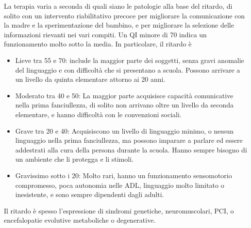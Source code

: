 La terapia varia a seconda di quali siano le patologie alla base del ritardo, di solito con un intervento riabilitativo precoce per
migliorare la comunicazione con la madre e la sperimentazione del bambino, e per migliorare la selezione delle informazioni rievanti nei
vari compiti.
Un QI minore di 70 indica un funzionamento molto sotto la media. In particolare, il ritardo è
\begin{itemize}
\item Lieve tra 55 e 70: include la maggior parte dei soggetti, senza gravi anomalie del linguaggio e con difficoltà che si presentano a
scuola. Possono arrivare a un livello da quinta elementare attorno ai 20 anni.
\item Moderato tra 40 e 50: La maggior parte acquisisce capacità comunicative nella prima fanciullezza, di solito non arrivano oltre un
livello da seconda elementare, e hanno difficoltà con le convenzioni sociali.
\item Grave tra 20 e 40: Acquisiscono un livello di linguaggio minimo, o nessun linguaggio nella prima fanciullezza, ma possono imparare
a parlare ed essere addestrati alla cura della persona durante la scuola. Hanno sempre bisogno di un ambiente che li protegga e li
stimoli.
\item Gravissimo sotto i 20: Molto rari, hanno un funzionamento sensomotorio compromesso, poca autonomia nelle ADL, linguaggio molto
limitato o inesistente, e sono sempre dipendenti dagli adulti.
\end{itemize}

Il ritardo è spesso l'espressione di sindromi genetiche, neuromuscolari, PCI, o encefalopatie evolutive metaboliche o degenerative.
